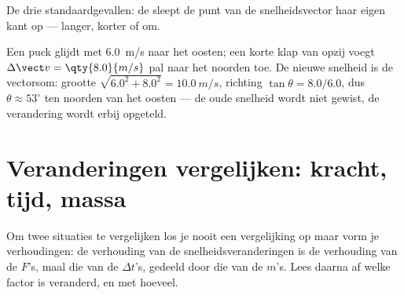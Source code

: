 \begin{omfigure}
\qquad
{}
\qquad
{}

{\small De drie standaardgevallen: de  sleept de punt
van de snelheidsvector haar eigen kant op --- langer, korter of om.}
\end{omfigure}

\begin{example}\label{ex:g11:forces-and-motion:kick}
Een puck glijdt met \qty{6.0}{m/s} naar het oosten; een korte klap van
opzij voegt $\Delta\vect v = \qty{8.0}{m/s}$ pal naar het noorden toe. De
nieuwe snelheid is de vectorsom: grootte
$\sqrt{6.0^2 + 8.0^2} = \qty{10.0}{m/s}$, richting
$\tan\theta = 8.0/6.0$, dus $\theta \approx 53^\circ$ ten noorden van het
oosten --- de oude snelheid wordt niet gewist, de verandering wordt
erbij opgeteld.
\end{example}

\section{Veranderingen vergelijken: kracht, tijd, massa}

\begin{method}\label{met:g11:forces-and-motion:ratio}
Om twee situaties te vergelijken los je nooit een vergelijking op maar
vorm je verhoudingen: de verhouding van de snelheidsveranderingen is de
verhouding van de $F$'s, maal die van de $\Delta t$'s, gedeeld door die
van de $m$'s. Lees daarna af welke factor is veranderd, en met hoeveel.
\end{method}

